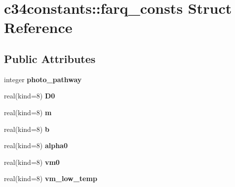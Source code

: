 \hypertarget{structc34constants_1_1farq__consts}{
\section{c34constants::farq\_\-consts Struct Reference}
\label{structc34constants_1_1farq__consts}
}
\subsection*{Public Attributes}
\begin{DoxyCompactItemize}
\item 
\hypertarget{structc34constants_1_1farq__consts_a825851b4b540d13a80d9cdbc876bc58a}{
integer {\bfseries photo\_\-pathway}}
\label{structc34constants_1_1farq__consts_a825851b4b540d13a80d9cdbc876bc58a}

\item 
\hypertarget{structc34constants_1_1farq__consts_a89e48bd2447ca183f2fa3342626759ee}{
real(kind=8) {\bfseries D0}}
\label{structc34constants_1_1farq__consts_a89e48bd2447ca183f2fa3342626759ee}

\item 
\hypertarget{structc34constants_1_1farq__consts_a0e4e6c0cf8894cafd7865d87fd6777a5}{
real(kind=8) {\bfseries m}}
\label{structc34constants_1_1farq__consts_a0e4e6c0cf8894cafd7865d87fd6777a5}

\item 
\hypertarget{structc34constants_1_1farq__consts_a02ff4801f693aa83da862b00607461d3}{
real(kind=8) {\bfseries b}}
\label{structc34constants_1_1farq__consts_a02ff4801f693aa83da862b00607461d3}

\item 
\hypertarget{structc34constants_1_1farq__consts_ac07e1eade4d8432242f00aafbbc04b32}{
real(kind=8) {\bfseries alpha0}}
\label{structc34constants_1_1farq__consts_ac07e1eade4d8432242f00aafbbc04b32}

\item 
\hypertarget{structc34constants_1_1farq__consts_a293191bda2ddf1bfb5259b559ed677d5}{
real(kind=8) {\bfseries vm0}}
\label{structc34constants_1_1farq__consts_a293191bda2ddf1bfb5259b559ed677d5}

\item 
\hypertarget{structc34constants_1_1farq__consts_aa0c49273cd30fbedcbcb5a82328dff15}{
real(kind=8) {\bfseries vm\_\-low\_\-temp}}
\label{structc34constants_1_1farq__consts_aa0c49273cd30fbedcbcb5a82328dff15}


\end{DoxyCompactItemize}
